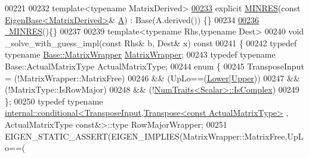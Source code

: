 \begin{DoxyCode}
00221         
00232         \textcolor{keyword}{template}<\textcolor{keyword}{typename} MatrixDerived>
\hyperlink{group___iterative_linear_solvers___module_a971bc758d11d1795d9e0abd3c958030b}{00233}         \textcolor{keyword}{explicit} \hyperlink{group___iterative_linear_solvers___module_a971bc758d11d1795d9e0abd3c958030b}{MINRES}(\textcolor{keyword}{const} \hyperlink{group___core___module_struct_eigen_1_1_eigen_base}{EigenBase<MatrixDerived>}& 
      \hyperlink{group___core___module_class_eigen_1_1_matrix}{A}) : Base(A.derived()) \{\}
00234         
\hyperlink{group___iterative_linear_solvers___module_a3f40ba58caac8b10ae7df474af93a05b}{00236}         \hyperlink{group___iterative_linear_solvers___module_a3f40ba58caac8b10ae7df474af93a05b}{~MINRES}()\{\}
00237 
00239         \textcolor{keyword}{template}<\textcolor{keyword}{typename} Rhs,\textcolor{keyword}{typename} Dest>
00240         \textcolor{keywordtype}{void} \_solve\_with\_guess\_impl(\textcolor{keyword}{const} Rhs& b, Dest& x)\textcolor{keyword}{ const}
00241 \textcolor{keyword}{        }\{
00242             \textcolor{keyword}{typedef} \textcolor{keyword}{typename} \hyperlink{class_eigen_1_1internal_1_1generic__matrix__wrapper}{Base::MatrixWrapper} 
      \hyperlink{class_eigen_1_1internal_1_1generic__matrix__wrapper}{MatrixWrapper};
00243             \textcolor{keyword}{typedef} \textcolor{keyword}{typename} Base::ActualMatrixType ActualMatrixType;
00244             \textcolor{keyword}{enum} \{
00245               TransposeInput  =   (!MatrixWrapper::MatrixFree)
00246                               &&  (UpLo==(\hyperlink{group__enums_gga39e3366ff5554d731e7dc8bb642f83cda891792b8ed394f7607ab16dd716f60e6}{Lower}|\hyperlink{group__enums_gga39e3366ff5554d731e7dc8bb642f83cda6bcb58be3b8b8ec84859ce0c5ac0aaec}{Upper}))
00247                               &&  (!MatrixType::IsRowMajor)
00248                               &&  (!\hyperlink{group___core___module_struct_eigen_1_1_num_traits}{NumTraits<Scalar>::IsComplex})
00249             \};
00250             \textcolor{keyword}{typedef} \textcolor{keyword}{typename} 
      \hyperlink{struct_eigen_1_1internal_1_1conditional}{internal::conditional<TransposeInput,Transpose<const ActualMatrixType>}
      , ActualMatrixType \textcolor{keyword}{const}&>::type RowMajorWrapper;
00251             EIGEN\_STATIC\_ASSERT(EIGEN\_IMPLIES(MatrixWrapper::MatrixFree,UpLo==(

\end{DoxyCode}
